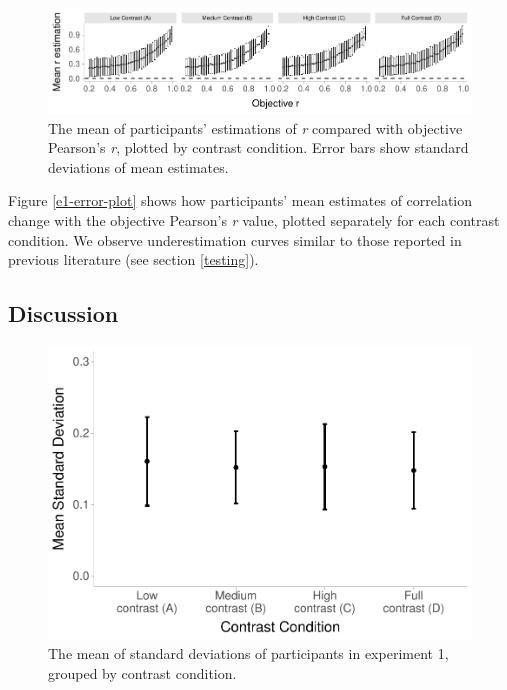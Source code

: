 \documentclass[preprint, 3p,
authoryear]{elsarticle} %
\begin{document}
\begin{figure}

{\centering \includegraphics{contrast_and_scatterplots_files/figure-latex/e1-error-plot-1} 

}

\caption{\label{e1-error-plot}The mean of participants' estimations of \textit{r} compared with objective Pearson's \textit{r}, plotted by contrast condition. Error bars show standard deviations of mean estimates.}\label{fig:e1-error-plot}
\end{figure}

Figure \ref{e1-error-plot} shows how participants' mean estimates of
correlation change with the objective Pearson's \emph{r} value, plotted
separately for each contrast condition. We observe underestimation
curves similar to those reported in previous literature (see section
\ref{testing}).

\hypertarget{discussion}{%
\subsection{Discussion}\label{discussion}}

\begin{figure}

\includegraphics[width=0.5\linewidth]{contrast_and_scatterplots_files/figure-latex/e1-sd-sd-plot-1} \hfill{}

\caption{\label{e1-sd-sd-plot}The mean of standard deviations of participants in experiment 1, grouped by contrast condition.}\label{fig:e1-sd-sd-plot}
\end{figure}
\end{document}
